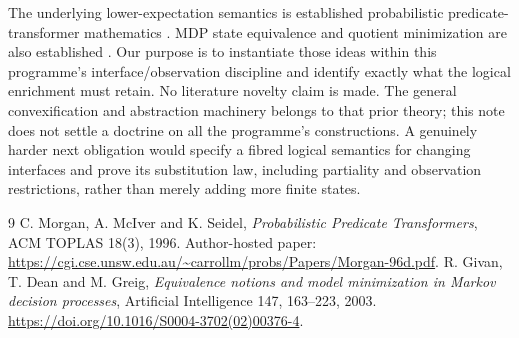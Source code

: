 \documentclass[11pt]{article}
\begin{document}
The underlying lower-expectation semantics is established probabilistic predicate-transformer mathematics \cite{morgan}. MDP state equivalence and quotient minimization are also established \cite{givan}. Our purpose is to instantiate those ideas within this programme's interface/observation discipline and identify exactly what the logical enrichment must retain. No literature novelty claim is made. The general convexification and abstraction machinery belongs to that prior theory; this note does not settle a doctrine on all the programme's constructions. A genuinely harder next obligation would specify a fibred logical semantics for changing interfaces and prove its substitution law, including partiality and observation restrictions, rather than merely adding more finite states.

\begin{thebibliography}{9}
 C. Morgan, A. McIver and K. Seidel, \emph{Probabilistic Predicate Transformers}, ACM TOPLAS 18(3), 1996. Author-hosted paper: \url{https://cgi.cse.unsw.edu.au/~carrollm/probs/Papers/Morgan-96d.pdf}.
 R. Givan, T. Dean and M. Greig, \emph{Equivalence notions and model minimization in Markov decision processes}, Artificial Intelligence 147, 163--223, 2003. \url{https://doi.org/10.1016/S0004-3702(02)00376-4}.
\end{thebibliography}
\end{document}

